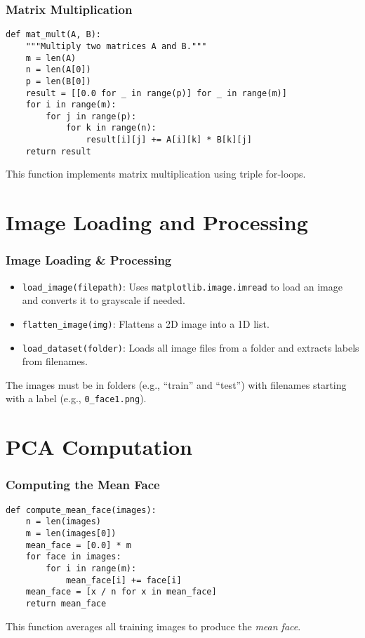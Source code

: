\documentclass{beamer}
\begin{document}
\begin{frame}[fragile]
  \frametitle{Matrix Multiplication}
  \begin{lstlisting}
def mat_mult(A, B):
    """Multiply two matrices A and B."""
    m = len(A)
    n = len(A[0])
    p = len(B[0])
    result = [[0.0 for _ in range(p)] for _ in range(m)]
    for i in range(m):
        for j in range(p):
            for k in range(n):
                result[i][j] += A[i][k] * B[k][j]
    return result
  \end{lstlisting}
  This function implements matrix multiplication using triple for‑loops.
\end{frame}

\section{Image Loading and Processing}

\begin{frame}[fragile]
  \frametitle{Image Loading \& Processing}
  \begin{itemize}
    \item \texttt{load\_image(filepath)}: Uses \texttt{matplotlib.image.imread} to load an image and converts it to grayscale if needed.
    \item \texttt{flatten\_image(img)}: Flattens a 2D image into a 1D list.
    \item \texttt{load\_dataset(folder)}: Loads all image files from a folder and extracts labels from filenames.
  \end{itemize}
  \vspace{3mm}
  The images must be in folders (e.g., ``train'' and ``test'') with filenames starting with a label (e.g., \texttt{0\_face1.png}).
\end{frame}

\section{PCA Computation}

\begin{frame}[fragile]
  \frametitle{Computing the Mean Face}
  \begin{lstlisting}
def compute_mean_face(images):
    n = len(images)
    m = len(images[0])
    mean_face = [0.0] * m
    for face in images:
        for i in range(m):
            mean_face[i] += face[i]
    mean_face = [x / n for x in mean_face]
    return mean_face
  \end{lstlisting}
  This function averages all training images to produce the \emph{mean face}.
\end{frame}
\end{document}
